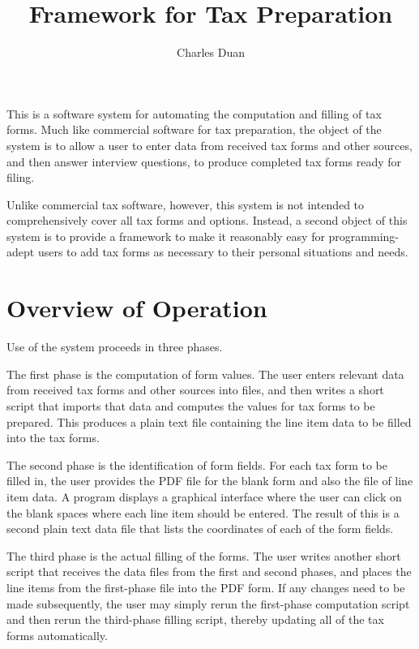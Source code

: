 \documentclass[12pt]{article}
\title{Framework for Tax Preparation}
\author{Charles Duan}
\begin{document}
\maketitle

\tableofcontents

This is a software system for automating the computation and filling of tax
forms. Much like commercial software for tax preparation, the object of the
system is to allow a user to enter data from received tax forms and other
sources, and then answer interview questions, to produce completed tax forms
ready for filing.

Unlike commercial tax software, however, this system is not intended to
comprehensively cover all tax forms and options. Instead, a second object of
this system is to provide a framework to make it reasonably easy for
programming-adept users to add tax forms as necessary to their personal
situations and needs.

\section{Overview of Operation}

Use of the system proceeds in three phases.

The first phase is the computation of form values. The user enters relevant data
from received tax forms and other sources into files, and then writes a short
script that imports that data and computes the values for tax forms to be
prepared. This produces a plain text file containing the line item data to be
filled into the tax forms.

The second phase is the identification of form fields. For each tax form to be
filled in, the user provides the PDF file for the blank form and also the file
of line item data. A program displays a graphical interface where the user can
click on the blank spaces where each line item should be entered. The result of
this is a second plain text data file that lists the coordinates of each of the
form fields.

The third phase is the actual filling of the forms. The user writes another
short script that receives the data files from the first and second phases, and
places the line items from the first-phase file into the PDF form. If any
changes need to be made subsequently, the user may simply rerun the first-phase
computation script and then rerun the third-phase filling script, thereby
updating all of the tax forms automatically.
\end{document}
